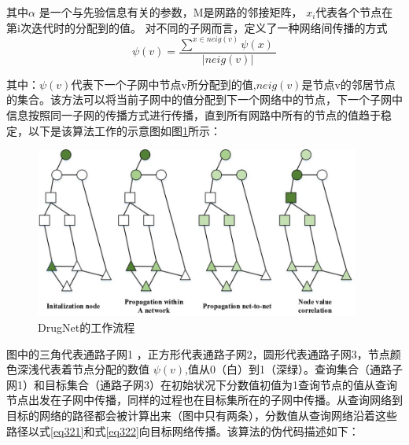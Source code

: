 其中$\alpha$ 是一个与先验信息有关的参数，M是网路的邻接矩阵， $x_{i}$代表各个节点在第i次迭代时的分配到的值。 对不同的子网而言，定义了一种网络间传播的方式
\begin{equation}
\psi (v) =\frac{\sum ^{x\in neig(v)} \psi (x) \ }{|neig(v) |}
\label{eq322}
\end{equation}

其中：$\psi(v)$代表下一个子网中节点v所分配到的值,$neig(v)$是节点v的邻居节点的集合。该方法可以将当前子网中的值分配到下一个网络中的节点，下一个子网中信息按照同一子网的传播方式进行传播，直到所有网路中所有的节点的值趋于稳定，以下是该算法工作的示意图如图\ref{fig41}所示：

\begin{figure}[h]
\centering
\includegraphics[width = 0.95\textwidth]{workflow}
\caption[fig41]{DrugNet的工作流程}
\label{fig41}
\end{figure}

图中的三角代表通路子网1 ，正方形代表通路子网2，圆形代表通路子网3，节点颜色深浅代表着节点分配的数值 $\psi (v)$,值从0（白）到1（深绿）。查询集合（通路子网1）和目标集合（通路子网3）在初始状况下分数值初值为1查询节点的值从查询节点出发在子网中传播，同样的过程也在目标集所在的子网中传播。从查询网络到目标的网络的路径都会被计算出来（图中只有两条），分数值从查询网络沿着这些路径以式\ref{eq321}和式\ref{eq322}向目标网络传播。该算法的伪代码描述如下：
\\
\\
\\
\\
\\
\\



